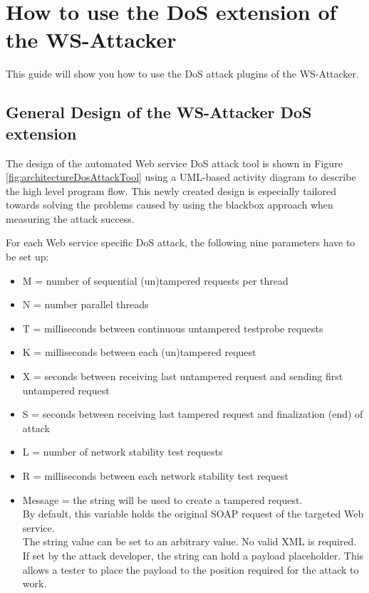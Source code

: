 \section{How to use the DoS extension of the WS-Attacker}
\label{sec:how_to_use_ws_attacker}

This guide will show you how to use the DoS attack plugins of the WS-Attacker.

\subsection{General Design of the WS-Attacker DoS extension}
\label{sec:design_DoS_extension}



The design of the automated Web service DoS attack tool is shown in Figure \ref{fig:architectureDosAttackTool} using a UML-based activity diagram to describe the high level program flow.
This newly created design is especially tailored towards solving the problems caused by using the blackbox approach when measuring the attack success.\newline

For each Web service specific DoS attack, the following nine parameters have to be set up:
\begin{itemize}
  \item M = number of sequential (un)tampered requests per thread 
  \item N = number parallel threads 
  \item T = milliseconds between continuous untampered testprobe requests
  \item K = milliseconds between each (un)tampered request 
  \item X = seconds between receiving last untampered request and sending first untampered request 
  \item S = seconds between receiving last tampered request and finalization (end) of attack 
  \item L = number of network stability test requests
  \item R = milliseconds between each network stability test request 
  \item Message = the string will be used to create a tampered request.\\
  By default, this variable holds the original SOAP request of the targeted Web service.\\
  The string value can be set to an arbitrary value. No valid XML is required.\\
  If set by the attack developer, the string can hold a payload placeholder. This allows a tester to place the payload to the position required for the attack to work.
\end{itemize}

